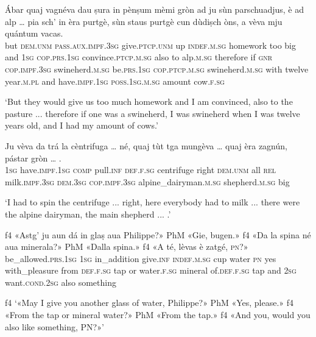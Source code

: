 \begin{linenumbers}
	\gll  Ábar quaj vagnéva dau ṣura in pènṣum mèmi gròn ad ju sùn parschuadjus, è ad alp … pia sch’ in èra purtgè, sùn staus purtgè cun dùdiṣch òns, a vèva mju quántum vacas.  \\
	but \textsc{dem.unm} \textsc{pass.aux.impf.3sg} give.\textsc{ptcp.unm} up \textsc{indef.m.sg} homework too big and \textsc{1sg} \textsc{cop.prs.1sg} convince.\textsc{ptcp.m.sg} also to alp.\textsc{m.sg} {} therefore if \textsc{gnr} \textsc{cop.impf.3sg} swineherd.\textsc{m.sg} be.\textsc{prs.1sg} \textsc{cop.ptcp.m.sg} swineherd\textsc{.m.sg} with twelve year.\textsc{m.pl} and have.\textsc{impf.1sg} \textsc{poss.1sg.m.sg} amount cow.\textsc{f.sg}\\
\end{linenumbers}
\medskip
\glt `But they would give us too much homework and I am convinced, also to the pasture ... therefore if one was a swineherd, I was swineherd when I was twelve years old, and I had my amount of cows.'
\medskip

\begin{linenumbers}
	\gll Ju vèva da trá la cèntrifuga … né, quaj tùt tga mungèva … quaj èra zagnún, pástar gròn … .  \\
\textsc{1sg} have.\textsc{impf.1sg} \textsc{comp} pull.\textsc{inf} \textsc{def.f.sg} centrifuge {} right \textsc{dem.unm} all \textsc{rel} milk.\textsc{impf.3sg} {} \textsc{dem.3sg} \textsc{cop.impf.3sg} alpine\_dairyman.\textsc{m.sg} shepherd.\textsc{m.sg} big\\
\end{linenumbers}
\medskip
\glt `I had to spin the centrifuge ... right, here everybody had to milk ... there were the alpine dairyman, the main shepherd ... .'
\medskip

\begin{linenumbers}
	\gll  {\ob}f4{\cb} «Astg’ ju aun dá in glaṣ aua Philippe?» {\ob}PhM{\cb} «Gie, bugen.» {\ob}f4{\cb} «Da la spina né aua minerala?» {\ob}PhM{\cb} «Dalla spina.» {\ob}f4{\cb} «A té, lèvas è zatgé, \textsc{pn}?»  \\
	{} be\_allowed.\textsc{prs.1sg} \textsc{1sg} in\_addition give.\textsc{inf} \textsc{indef.m.sg} cup water \textsc{pn} {} yes with\_pleasure {} from \textsc{def.f.sg} tap or water.\textsc{f.sg} mineral {} of.\textsc{def.f.sg} tap {} and \textsc{2sg} want.\textsc{cond.2sg} also something\\
\end{linenumbers}
\medskip
\glt {\ob}f4{\cb} `«May I give you another glass of water, Philippe?» {\ob}PhM{\cb} «Yes, please.» {\ob}f4{\cb} «From the tap or mineral water?» {\ob}PhM{\cb} «From the tap.» {\ob}f4{\cb} «And you, would you also like something, PN?»'
\medskip

